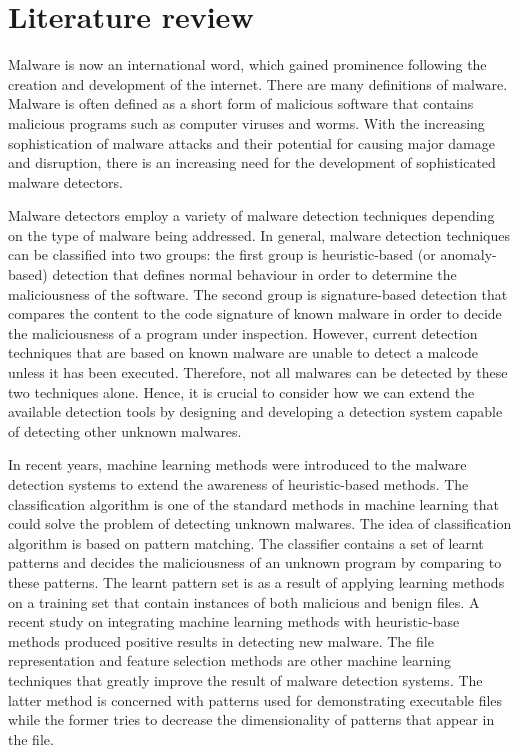 \section{Literature review}

Malware is now an international word, which gained prominence following the creation and development of the internet. There are many definitions of malware. Malware is often defined as a short form of malicious software that contains malicious programs such as computer viruses and worms. With the increasing sophistication of malware attacks and their potential for causing major damage and disruption, there is an increasing need for the development of sophisticated malware detectors\cite{Malware-tech}.

Malware detectors employ a variety of malware detection techniques depending on the type of malware being addressed. In general, malware detection techniques can be classified into two groups: the first group is heuristic-based (or anomaly-based) detection that defines normal behaviour in order to determine the maliciousness of the software. The second group is signature-based detection that compares the content to the code signature of known malware in order to decide the maliciousness of a program under inspection. However, current detection techniques that are based on known malware are unable to detect a malcode unless it has been executed. Therefore, not all malwares can be detected by these two techniques alone. Hence, it is crucial to consider how we can extend the available detection tools by designing and developing a detection system capable of detecting other unknown malwares\cite{Malware-tech}.
 

In recent years, machine learning methods were introduced to the malware detection systems to extend the awareness of heuristic-based methods. The classification algorithm is one of the standard methods in machine learning that could solve the problem of detecting unknown malwares\cite{Machin-lear}.
The idea of classification algorithm is based on pattern matching. The classifier contains a set of learnt patterns and decides the maliciousness of an unknown program by comparing to these patterns. The learnt pattern set is as a result of applying learning methods on a training set that contain instances of both malicious and benign files. A recent study on integrating machine learning methods with heuristic-base methods produced positive results in detecting new malware\cite{Machin-lear}.
The file representation and feature selection methods are other machine learning techniques that greatly improve the result of malware detection systems. The latter method is concerned with patterns used for demonstrating executable files while the former tries to decrease the dimensionality of patterns that appear in the file\cite{Machin-lear}.

